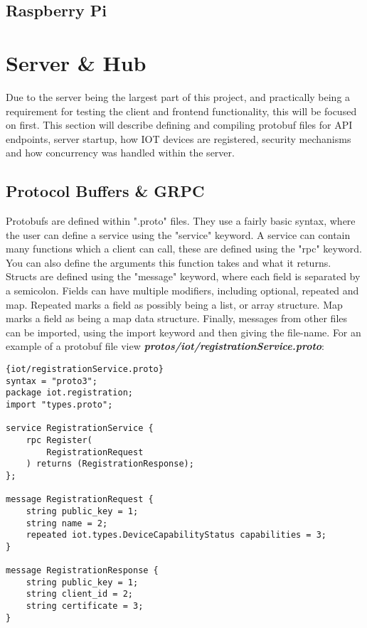 \subsection{Raspberry Pi} \label{sec:chap3:technology:raspi}

\section{Server \& Hub} \label{sec:chap3:server}
Due to the server being the largest part of this project, and practically being a requirement for testing the client and frontend functionality, this will be focused on first. This section will describe defining and compiling protobuf files for API endpoints, server startup, how IOT devices are registered, security mechanisms and how concurrency was handled within the server. 

\subsection{Protocol Buffers \& GRPC} \label{sec:chap3:server:protoBufs}
Protobufs are defined within ".proto" files. They use a fairly basic syntax, where the user can define a service using the "service" keyword. A service can contain many functions which a client can call, these are defined using the "rpc" keyword. You can also define the arguments this function takes and what it returns. Structs are defined using the "message" keyword, where each field is separated by a semicolon. Fields can have multiple modifiers, including optional, repeated and map. Repeated marks a field as possibly being a list, or array structure. Map marks a field as being a map data structure. Finally, messages from other files can be imported, using the import keyword and then giving the file-name. \cite{protobufDocs} For an example of a protobuf file view \textbf{\textit{protos/iot/registrationService.proto}}:

\begin{lstlisting}[language=protobuf3, style=boxed]{iot/registrationService.proto}
syntax = "proto3";
package iot.registration;
import "types.proto";

service RegistrationService {
    rpc Register(
        RegistrationRequest
    ) returns (RegistrationResponse);
};

message RegistrationRequest {
    string public_key = 1;
    string name = 2;
    repeated iot.types.DeviceCapabilityStatus capabilities = 3;
}

message RegistrationResponse {
    string public_key = 1;
    string client_id = 2;
    string certificate = 3;
}
\end{lstlisting}

